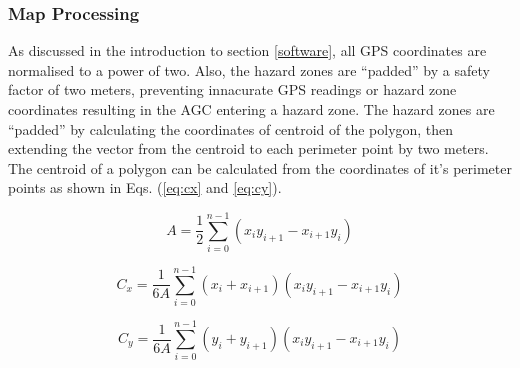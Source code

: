 \documentclass[11pt,landscape]{article}
\begin{document}
\begin{multicols}{3}
\subsubsection{Map Processing}
As discussed in the introduction to section \ref{software}, all GPS coordinates
are normalised to a power of two. Also, the hazard zones are ``padded''  by a
safety factor of two meters, preventing innacurate GPS readings or hazard zone
coordinates resulting in the AGC entering a hazard zone. The hazard zones are
``padded'' by calculating the coordinates of centroid of the polygon, then
extending the vector from the centroid to each perimeter point by two meters.
The centroid of a polygon can be calculated from the coordinates of it's
perimeter points as shown in Eqs. (\ref{eq:cx} and \ref{eq:cy}).
\begin{center}
    \begin{equation*}
        A=\frac{1}{2}\sum_{i=0}^{n-1}\left( x_i y_{i+1} - x_{i+1} y_i\right)
    \end{equation*}
\end{center}
\begin{center}
    \begin{equation}
        C_x=\frac{1}{6A}\sum_{i=0}^{n-1} (x_i + x_{i+1}) (x_i y_{i+1} - x_{i+1} y_i)
        \label{eq:cx}
    \end{equation}
\end{center}
\begin{center}
    \begin{equation}
        C_y=\frac{1}{6A}\sum_{i=0}^{n-1} (y_i + y_{i+1}) (x_i y_{i+1} - x_{i+1} y_i)
        \label{eq:cy}
    \end{equation}
\end{center}

\end{multicols}
\end{document}
